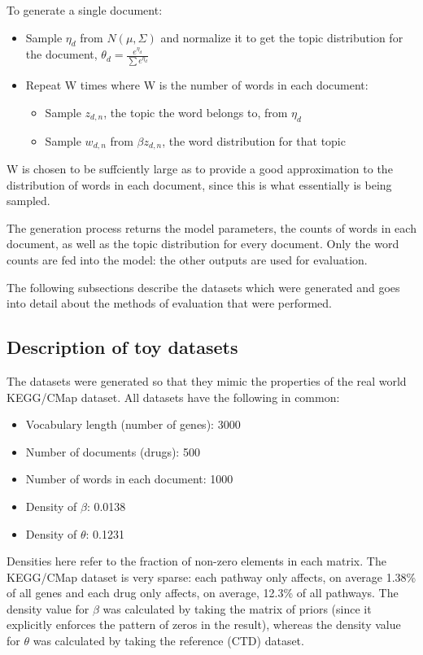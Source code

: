 \documentclass[12pt,a4paper,twoside,openright]{report}
\begin{document}
To generate a single document:

\begin{itemize}[noitemsep]
\item Sample $\eta_d$ from $N(\mu, \Sigma)$ and normalize it to get the topic distribution for the document, $\theta_d = \frac{e^{\eta_d}}{\sum{e^{\eta_d}}}$
\item Repeat W times where W is the number of words in each document:
\begin{itemize}[noitemsep]
\item Sample $z_{d, n}$, the topic the word belongs to, from $\eta_d$
\item Sample $w_{d, n}$ from $\beta{z_{d, n}}$, the word distribution for that topic
\end{itemize}
\end{itemize}

W is chosen to be suffciently large as to provide a good approximation to the distribution of words in each document, since this is what essentially is being sampled.

The generation process returns the model parameters, the counts of words in each document, as well as the topic distribution for every document. Only the word counts are fed into the model: the other outputs are used for evaluation.

The following subsections describe the datasets which were generated and goes into detail about the methods of evaluation that were performed.

\subsection{Description of toy datasets}

The datasets were generated so that they mimic the properties of the real world KEGG/CMap dataset. All datasets have the following in common:

\begin{itemize}[noitemsep]
\item Vocabulary length (number of genes): 3000
\item Number of documents (drugs): 500
\item Number of words in each document: 1000
\item Density of $\beta$: 0.0138
\item Density of $\theta$: 0.1231
\end{itemize}

Densities here refer to the fraction of non-zero elements in each matrix. The KEGG/CMap dataset is very sparse: each pathway only affects, on average 1.38\% of all genes and each drug only affects, on average, 12.3\% of all pathways. The density value for $\beta$ was calculated by taking the matrix of priors (since it explicitly enforces the pattern of zeros in the result), whereas the density value for $\theta$ was calculated by taking the reference (CTD) dataset.
\end{document}
